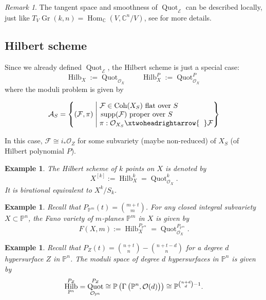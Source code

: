 \documentclass[UTF8]{amsart}
\numberwithin{equation}{section}
\theoremstyle{plain}
\newtheorem{eg}[theorem]{Example}
\numberwithin{equation}{section}
\theoremstyle{remark}
\newtheorem{remark}[theorem]{Remark}
\DeclareMathOperator{\Hom}{\operatorname{Hom}}	\DeclareMathOperator{\End}{\operatorname{End}}
\DeclareMathOperator{\supp}{\operatorname{supp}}
\DeclareMathOperator{\Gr}{\operatorname{Gr}}
\DeclareMathOperator{\Coh}{\operatorname{Coh}}
\DeclareMathOperator{\Quot}{\operatorname{Quot}}
\DeclareMathOperator{\Hilb}{\operatorname{Hilb}}
\begin{document}
\begin{remark}
The tangent space and smoothness of $\Quot_{\mathcal{E}}$ can be described locally, just like $T_V \Gr(k,n) = \Hom_{\mathbb{C}}(V, \mathbb{C}^n/V)$, see \cite{bibid} for more details.
\end{remark}

\subsection{Hilbert scheme}
Since we already defined $\Quot_{\mathcal{E}}$, the Hilbert scheme is just a special case:
$$\Hilb_X:= \Quot_{\mathcal{O}_X} \qquad \Hilb_X^P:= \Quot_{\mathcal{O}_X}^P$$
where the moduli problem is given by

$$\mathcal{A}_S=\left\{(\mathcal{F},\pi)  \;\middle|\; \begin{aligned}
&\\[-5mm]
&\mathcal{F} \in \Coh(X_S) \text{ flat over $S$ }\\[-1mm]
&\supp(\mathcal{F})  \text{ proper over $S$ }\\[-1mm]
& \pi:\mathcal{O}_{X_S} \xtwoheadrightarrow{\hspace{2mm}}  \mathcal{F}
\end{aligned}
 \right\}$$
 
 In this case, $\mathcal{F} \cong i_* \mathcal{O}_Z$ for some subvariety (maybe non-reduced) of $X_S$ (of Hilbert polynomial $P$).
 
\begin{eg}
The Hilbert scheme of $k$ points on $X$ is denoted by $$X^{[k]}:= \Hilb_X^k= \Quot_{\mathcal{O}_X}^k.$$
It is birational equivalent to $X^k/S_k$.
\end{eg} 

\begin{eg}
Recall that $P_{\mathbb{P}^m}(t) = \binom{m+t}{m}$. For any closed integral subvariety $X \subset \mathbb{P}^n$, the Fano variety of $m$-planes $\mathbb{P}^m$ in $X$ is given by
$$F(X,m):= \Hilb_X^{P_{\mathbb{P}^m}}= \Quot_{\mathcal{O}_X}^{P_{\mathbb{P}^m}}.$$
\end{eg} 
\begin{eg}
Recall that $P_{Z}(t) = \binom{n+t}{n}- \binom{n+t-d}{n}$ for a degree $d$ hypersurface $Z$ in $\mathbb{P}^n$.
The moduli space of degree $d$ hypersurfaces in $\mathbb{P}^n$ is given by
$$\Hilb_{\mathbb{P}^n}^{P_{Z}}= \Quot_{\mathcal{O}_{\mathbb{P}^n}}^{P_{Z}} \cong \mathbb{P}\left(\rule{0mm}{3.2mm} \Gamma \left(\rule{0mm}{3mm} \mathbb{P}^n, \mathcal{O}(d) \right) \right) \cong \mathbb{P}^{\binom{n+d}{d}-1}.$$
\end{eg} 


\end{document}

